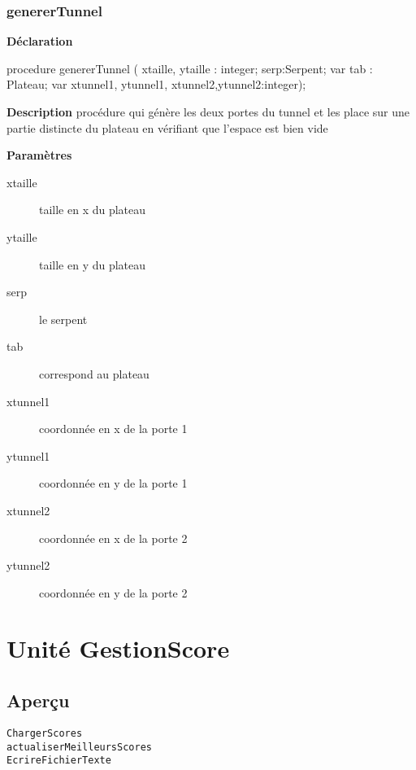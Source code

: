 \documentclass{report}
\newif\ifpdf
\begin{document}
\subsection*{genererTunnel}
\fi
\label{Generation-genererTunnel}
\begin{list}{}{
\setlength{\itemindent}{0cm}
\setlength{\listparindent}{0cm}
\setlength{\leftmargin}{\evensidemargin}
\addtolength{\leftmargin}{\tmplength}
\settowidth{\labelsep}{X}
\addtolength{\leftmargin}{\labelsep}
\setlength{\labelwidth}{\tmplength}
}
\item[\textbf{Déclaration}\hfill]
\ifpdf
\begin{flushleft}
\fi
\begin{ttfamily}
procedure genererTunnel ( xtaille, ytaille : integer; serp:Serpent; var tab : Plateau; var xtunnel1, ytunnel1, xtunnel2,ytunnel2:integer);\end{ttfamily}

\ifpdf
\end{flushleft}
\fi

\par
\item[\textbf{Description}]
procédure qui génère les deux portes du tunnel et les place sur une partie distincte du plateau en vérifiant que l'espace est bien vide        \par
\item[\textbf{Paramètres}]
\begin{description}
\item[xtaille] taille en x du plateau
\item[ytaille] taille en y du plateau
\item[serp] le serpent
\item[tab] correspond au plateau
\item[xtunnel1] coordonnée en x de la porte 1
\item[ytunnel1] coordonnée en y de la porte 1
\item[xtunnel2] coordonnée en x de la porte 2
\item[ytunnel2] coordonnée en y de la porte 2
\end{description}


\end{list}
\chapter{Unité GestionScore}
\label{GestionScore}
\section{Aperçu}
\begin{description}
\item[\texttt{ChargerScores}]
\item[\texttt{actualiserMeilleursScores}]
\item[\texttt{EcrireFichierTexte}]
\end{description}
\end{document}
